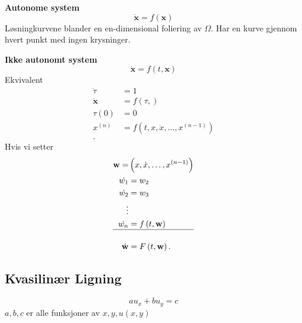 \documentclass{article}
\theoremstyle{remark}
\newcommand{\newpara}
  {
  \vskip 0.4cm
  }
\begin{document}
\begin{tcolorbox}
  \textbf{Autonome system}  \[
\dot{\mathbf{x}} = f\left( \mathbf{x} \right)
  \] 
  Løsningkurvene blander en en-dimensional foliering av $\Omega $. Har en kurve gjennom hvert punkt med ingen krysninger.
  \newpara
  \textbf{Ikke autonomt system} 
  \[
  \dot{\mathbf{x}} = f\left( t, \mathbf{x} \right)
  \] 
  Ekvivalent 
  \begin{align*}
     \dot{\tau } &= 1 \\  
     \dot{\mathbf{x}}  & = f\left( \tau ,  \right)\\
    \tau \left( 0 \right) &= 0 \\ 
    x^{(n)} &= f\left( t, x, \dot{x} , \ldots, x^{(n-1)} \right) \\
  .\end{align*}
  Hvis vi setter 
  \begin{align*}
    \mathbf{w} = &  \left( x, \dot{x}, \ldots, x^{(n-1)} \right) \\
    \dot{w_{1}} &= w_{2} \\
    \dot{w_{2}} &=  w_{3} \\
    \vdots  & \\
    \dot{w_{n} }  & = f\left( t, \mathbf{w} \right) \\
    \hline \\
    \dot{\mathbf{w}} &= F\left(t, \mathbf{w}  \right)
  .\end{align*}
\end{tcolorbox}

\subsection{Kvasilinær Ligning}%
\label{sub:kvasi_linear_lining}

\[
au_{x} + b u_{y} = c
\] 
$a,b,c$ er alle funksjoner av  $x,y, u\left( x,y \right)$
\end{document}
